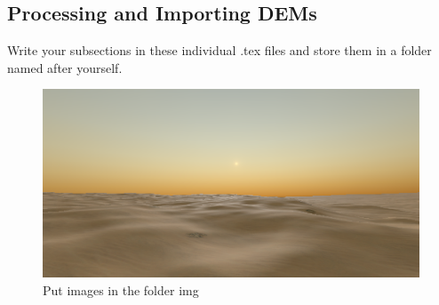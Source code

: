 \subsection{Processing and Importing DEMs}

Write your subsections in these individual .tex files and store them in a folder named after yourself.

\begin{figure}
	\centering
	\includegraphics[width=\linewidth]{img/Example_Image}
	\caption{Put images in the folder img}
\end{figure}